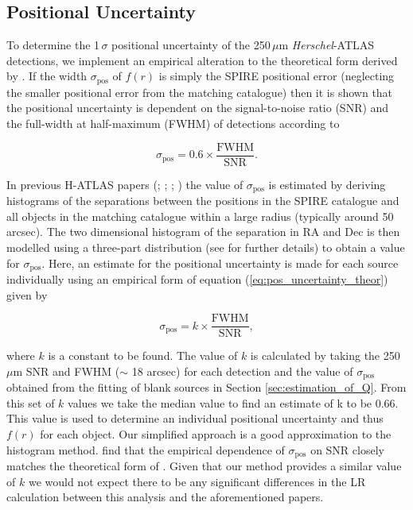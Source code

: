 \documentclass[fleqn,usenatbib]{mnras}
\begin{document}
\subsection{Positional Uncertainty}
\label{sec:positional_uncertainty}

To determine the 1\,$\sigma$ positional uncertainty of the 250\,$\mu$m \textit{Herschel}-ATLAS detections, we implement an empirical alteration to the theoretical form derived by \citealt{Ivison_2007}. If the width $\sigma_{\textrm{pos}}$ of $f(r)$ is simply the SPIRE positional error (neglecting the smaller positional error from the matching catalogue) then it is shown that the positional uncertainty is dependent on the signal-to-noise ratio (SNR) and the full-width at half-maximum (FWHM) of detections according to

\begin{equation}
\label{eq:pos_uncertainty_theor}
\sigma_{\textrm{pos}} = 0.6 \times \frac{\textrm{FWHM}}{\textrm{SNR}}.
\end{equation}

In previous H-ATLAS papers (\citealt{Smith_2011}; \citealt{Bourne_2014}; \citealt{Bourne_2016}; \citealt{Furlanetto_2018}) the value of $\sigma_{\textrm{pos}}$ is estimated by deriving histograms of the separations between the positions in the SPIRE catalogue and all objects in the matching catalogue within a large radius (typically around 50 arcsec). The two dimensional histogram of the separation in RA and Dec is then modelled using a three-part distribution (see \citealt{Smith_2011} for further details) to obtain a value for $\sigma_{\textrm{pos}}$. Here, an estimate for the positional uncertainty is made for each source individually using an empirical form of equation (\ref{eq:pos_uncertainty_theor}) given by

\begin{equation}
\label{eq:pos_uncertainty_k}
\sigma_{\textrm{pos}} = k \times \frac{\textrm{FWHM}}{\textrm{SNR}},
\end{equation}

\noindent where $k$ is a constant to be found. The value of $k$ is calculated by taking the 250\,$\mu$m SNR and FWHM ($\sim$ 18 arcsec) for each detection and the value of $\sigma_{\textrm{pos}}$ obtained from the fitting of blank sources in Section \ref{sec:estimation_of_Q}. From this set of $k$ values we take the median value to find an estimate of k to be 0.66. This value is used to determine an individual positional uncertainty and thus $f(r)$ for each object. Our simplified approach is a good approximation to the histogram method. \citealt{Furlanetto_2018} find that the empirical dependence of $\sigma_{\textrm{pos}}$ on SNR closely matches the theoretical form of \citealt{Ivison_2007}. Given that our method provides a similar value of $k$ we would not expect there to be any significant differences in the LR calculation between this analysis and the aforementioned papers.
\end{document}
